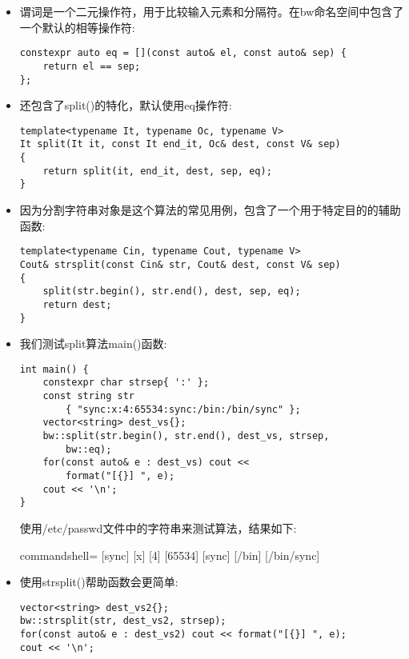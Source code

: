 \begin{itemize}
\item 
谓词是一个二元操作符，用于比较输入元素和分隔符。在bw命名空间中包含了一个默认的相等操作符:

\begin{lstlisting}[style=styleCXX]
constexpr auto eq = [](const auto& el, const auto& sep) {
	return el == sep;
};
\end{lstlisting}

\item 
还包含了split()的特化，默认使用eq操作符:

\begin{lstlisting}[style=styleCXX]
template<typename It, typename Oc, typename V>
It split(It it, const It end_it, Oc& dest, const V& sep)
{
	return split(it, end_it, dest, sep, eq);
}
\end{lstlisting}

\item 
因为分割字符串对象是这个算法的常见用例，包含了一个用于特定目的的辅助函数:

\begin{lstlisting}[style=styleCXX]
template<typename Cin, typename Cout, typename V>
Cout& strsplit(const Cin& str, Cout& dest, const V& sep)
{
	split(str.begin(), str.end(), dest, sep, eq);
	return dest;
}
\end{lstlisting}

\item 
我们测试split算法main()函数:

\begin{lstlisting}[style=styleCXX]
int main() {
	constexpr char strsep{ ':' };
	const string str
		{ "sync:x:4:65534:sync:/bin:/bin/sync" };
	vector<string> dest_vs{};
	bw::split(str.begin(), str.end(), dest_vs, strsep,
		bw::eq);
	for(const auto& e : dest_vs) cout <<
		format("[{}] ", e);
	cout << '\n';
}
\end{lstlisting}

使用/etc/passwd文件中的字符串来测试算法，结果如下:

\begin{tcblisting}{commandshell={}}
[sync] [x] [4] [65534] [sync] [/bin] [/bin/sync]
\end{tcblisting}

\item 
使用strsplit()帮助函数会更简单:

\begin{lstlisting}[style=styleCXX]
vector<string> dest_vs2{};
bw::strsplit(str, dest_vs2, strsep);
for(const auto& e : dest_vs2) cout << format("[{}] ", e);
cout << '\n';
\end{lstlisting}


\end{itemize}
